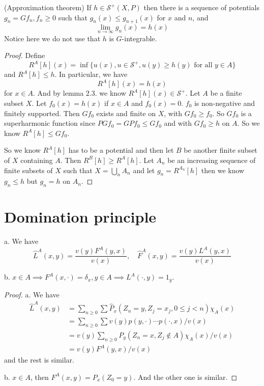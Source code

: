 \documentclass[lang=en,11pt,a4paper,citestyle =authoryear]{elegantpaper}
\newcommand{\Sar}{\mathcal{S}}
\begin{document}
\begin{theorem}
    (Approximation theorem) If $h \in \Sar^+(X,P)$ then there is a sequence of potentials $g_n = Gf_n, f_n \geq 0$ such that $g_n(x) \leq g_{n+1}(x)$ for $x$ and $n$, and
    \[
    \lim_{n\to\infty} g_n(x) = h(x)
    \]
    Notice here we do not use that $h$ is $G$-integrable.
\end{theorem}
\begin{proof}
    Define
    \[
    R^A[h](x) = \inf\{u(x), u\in\Sar^+, u(y) \geq h(y)\text{ for all }y\in A\}
    \]
    and $R^A[h] \leq h$. In particular, we have
    \[
    R^A[h](x) = h(x) 
    \]
    for $x\in A$. And by lemma 2.3. we know $R^A[h](x) \in \Sar^+$. Let $A$ be a finite subset $X$. Let $f_0 (x) = h(x)$ if $x\in A$ and $f_0(x) = 0$. $f_0$ is non-negative and finitely supported. Then $Gf_0$ exists and finite on $X$, with $Gf_0 \geq f_0$. So $Gf_0$ is a superharmonic function since $P Gf_0 = GPf_0 \leq Gf_0$ and with $Gf_0 \geq h$ on  $A$. So we know $R^A[h]\leq Gf_0$.\par
    So we know $R^A[h]$ has to be a potential and then let $B$ be another finite subset of $X$ containing $A$. Then $R^{B}[h]\geq R^{A}[h]$. Let $A_n$ be an increasing sequence of finite subsets of $X$ such that $X = \bigcup_{n}A_n$ and let $g_n = R^{A_n}[h]$ then we know $g_n \leq h$ but $g_n = h$ on $A_n$. 
\end{proof}

\section{Domination principle}

\begin{proposition}
    a. We have
    \[
    \hat{L}^A(x,y) = \dfrac{v(y)F^A(y,x)}{v(x)},\quad \hat{F}^A(x,y) = \dfrac{v(y)L^A(y,x)}{v(x)}
    \]\par
    b. $x\in A \implies F^A(x,\cdot) = \delta_x, y\in A \implies L^A(\cdot,y) = 1_y$.
\end{proposition}
\begin{proof}
    a. We have
    \[
    \begin{aligned}
        \hat{L}^A(x,y) &= \sum\limits_{n\geq 0}\sum \hat{P}_x(Z_n = y, Z_j = x_j, 0\leq j < n)\chi_A(x) \\
        &= \sum\limits_{n\geq 0}\sum v(y)p(y,\cdot)\cdots p(\cdot,x)/v(x) \\
        &= v(y)\sum\limits_{n\geq 0}P_y(Z_n=x,Z_j\notin A)\chi_A(x)/v(x) \\
        &= v(y)F^A(y,x)/v(x)
    \end{aligned} 
    \]
    and the rest is similar.\par
    b. $x\in A$, then $F^A(x,y) = P_x(Z_0 = y)$. And the other one is similar.
\end{proof}
\end{document}
